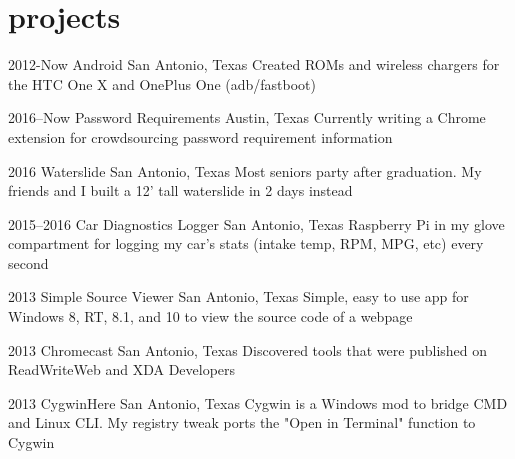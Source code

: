 \documentclass[]{friggeri-cv} %
\begin{document}

\section{projects}

\begin{entrylist}

	\entry
	{2012-Now}
	{Android}
	{San Antonio, Texas}
	{Created ROMs and wireless chargers for the HTC One X and OnePlus One (adb/fastboot)}


	\entry
	{2016--Now}
	{Password Requirements}
	{Austin, Texas}
	{Currently writing a Chrome extension for crowdsourcing password requirement information}


	\entry
	{2016}
	{Waterslide}
	{San Antonio, Texas}
	{Most seniors party after graduation. My friends and I built a 12' tall waterslide in 2 days instead}


	\entry
	{2015--2016}
	{Car Diagnostics Logger}
	{San Antonio, Texas}
	{Raspberry Pi in my glove compartment for logging my car's stats (intake temp, RPM, MPG, etc) every  second}


	\entry
	{2013}
	{Simple Source Viewer}
	{San Antonio, Texas}
	{Simple, easy to use app for Windows 8, RT, 8.1, and 10 to view the source code of a webpage}


	\entry
	{2013}
	{Chromecast}
	{San Antonio, Texas}
	{Discovered tools that were published on ReadWriteWeb and XDA Developers}


	\entry
	{2013}
	{CygwinHere}
	{San Antonio, Texas}
	{Cygwin is a Windows mod to bridge CMD and Linux CLI. My registry tweak ports the "Open in Terminal" function to Cygwin}

\end{entrylist}
\end{document}
